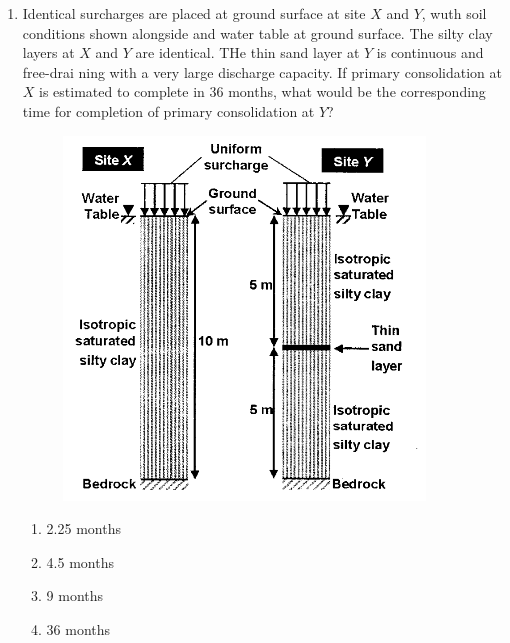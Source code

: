 \documentclass[journal,12pt,onecolumn]{IEEEtran}
\theoremstyle{remark}
\begin{document}
\begin{enumerate}
\item Identical surcharges are placed at ground surface at site $X$ and $Y$, wuth soil conditions shown alongside and water table at ground surface. The silty clay layers at $X$ and $Y$ are identical. THe thin sand layer at $Y$ is continuous and free-drai ning with a very large discharge capacity. If primary consolidation at $X$ is estimated to complete in 36 months, what would be the corresponding time for completion of primary consolidation at $Y$?
\begin{figure}[ht]
\centering
\includegraphics[scale=0.4]{figs/fig6.png}
\end{figure}
	\begin{multicols}{4}
	\begin{enumerate}
		\item 2.25 months
		\item 4.5 months
		\item 9 months
		\item 36 months
	\end{enumerate}
	\end{multicols}


\end{enumerate}
\end{document}
